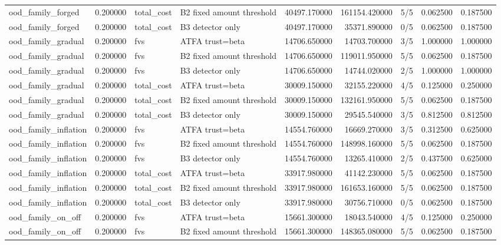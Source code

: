 \begin{tabular}{lrllrrlrr}
ood\_family\_forged & 0.200000 & total\_cost & B2 fixed amount threshold & 40497.170000 & 161154.420000 & 5/5 & 0.062500 & 0.187500 \\
ood\_family\_forged & 0.200000 & total\_cost & B3 detector only & 40497.170000 & 35371.890000 & 0/5 & 0.062500 & 0.187500 \\
ood\_family\_gradual & 0.200000 & fvs & ATFA trust=beta & 14706.650000 & 14703.700000 & 3/5 & 1.000000 & 1.000000 \\
ood\_family\_gradual & 0.200000 & fvs & B2 fixed amount threshold & 14706.650000 & 119011.950000 & 5/5 & 0.062500 & 0.187500 \\
ood\_family\_gradual & 0.200000 & fvs & B3 detector only & 14706.650000 & 14744.020000 & 2/5 & 1.000000 & 1.000000 \\
ood\_family\_gradual & 0.200000 & total\_cost & ATFA trust=beta & 30009.150000 & 32155.220000 & 4/5 & 0.125000 & 0.250000 \\
ood\_family\_gradual & 0.200000 & total\_cost & B2 fixed amount threshold & 30009.150000 & 132161.950000 & 5/5 & 0.062500 & 0.187500 \\
ood\_family\_gradual & 0.200000 & total\_cost & B3 detector only & 30009.150000 & 29545.540000 & 3/5 & 0.812500 & 0.812500 \\
ood\_family\_inflation & 0.200000 & fvs & ATFA trust=beta & 14554.760000 & 16669.270000 & 3/5 & 0.312500 & 0.625000 \\
ood\_family\_inflation & 0.200000 & fvs & B2 fixed amount threshold & 14554.760000 & 148998.160000 & 5/5 & 0.062500 & 0.187500 \\
ood\_family\_inflation & 0.200000 & fvs & B3 detector only & 14554.760000 & 13265.410000 & 2/5 & 0.437500 & 0.625000 \\
ood\_family\_inflation & 0.200000 & total\_cost & ATFA trust=beta & 33917.980000 & 41142.230000 & 5/5 & 0.062500 & 0.187500 \\
ood\_family\_inflation & 0.200000 & total\_cost & B2 fixed amount threshold & 33917.980000 & 161653.160000 & 5/5 & 0.062500 & 0.187500 \\
ood\_family\_inflation & 0.200000 & total\_cost & B3 detector only & 33917.980000 & 30756.710000 & 0/5 & 0.062500 & 0.187500 \\
ood\_family\_on\_off & 0.200000 & fvs & ATFA trust=beta & 15661.300000 & 18043.540000 & 4/5 & 0.125000 & 0.250000 \\
ood\_family\_on\_off & 0.200000 & fvs & B2 fixed amount threshold & 15661.300000 & 148365.080000 & 5/5 & 0.062500 & 0.187500 \\

\end{tabular}
